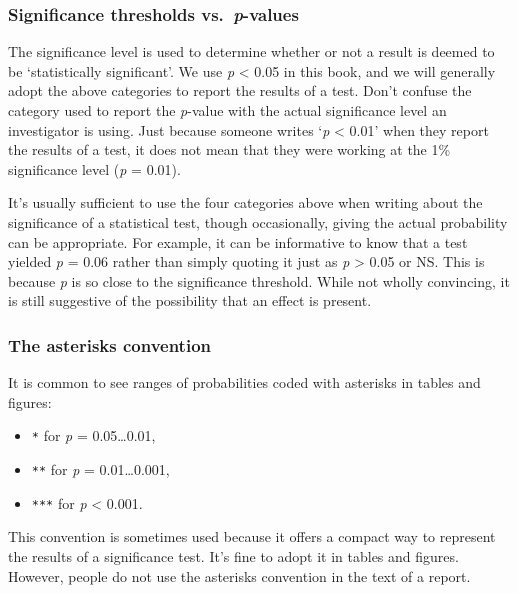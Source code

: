 \documentclass[
]{book}
\providecommand{\tightlist}{%
  \setlength{\itemsep}{0pt}\setlength{\parskip}{0pt}}
\newenvironment{greybox}{
  \definecolor{shadecolor}{rgb}{0.95,0.95,0.95}  %
  \color{black}
  \begin{shaded}}
 {\end{shaded}}
\newenvironment{infobox}[1]
  {
  \begin{itemize}
  \renewcommand{\labelitemi}{
    \raisebox{-.7\height}[0pt][0pt]{
      {\setkeys{Gin}{width=3em,keepaspectratio}
        \texttt{[image: images/\#1]}}
    }
  }
  \setlength{\fboxsep}{1em}
  \begin{greybox}
  \item
  }
  {
  \end{greybox}
  \end{itemize}
  }
\begin{document}
\begin{infobox}{warning}

\hypertarget{significance-thresholds-vs.-p-values}{%
\subsubsection*{\texorpdfstring{Significance thresholds vs.~\emph{p}-values}{Significance thresholds vs.~p-values}}\label{significance-thresholds-vs.-p-values}}

The significance level is used to determine whether or not a result is deemed to be `statistically significant'. We use \emph{p} \textless{} 0.05 in this book, and we will generally adopt the above categories to report the results of a test. Don't confuse the category used to report the \emph{p}-value with the actual significance level an investigator is using. Just because someone writes `\emph{p} \textless{} 0.01' when they report the results of a test, it does not mean that they were working at the 1\% significance level (\emph{p} = 0.01).

\end{infobox}

It's usually sufficient to use the four categories above when writing about the significance of a statistical test, though occasionally, giving the actual probability can be appropriate. For example, it can be informative to know that a test yielded \emph{p} = 0.06 rather than simply quoting it just as \emph{p} \textgreater{} 0.05 or NS. This is because \emph{p} is so close to the significance threshold. While not wholly convincing, it is still suggestive of the possibility that an effect is present.

\begin{infobox}{information}

\hypertarget{the-asterisks-convention}{%
\subsubsection*{The asterisks convention}\label{the-asterisks-convention}}

It is common to see ranges of probabilities coded with asterisks in tables and figures:

\begin{itemize}
\tightlist
\item
  \texttt{*} for \emph{p} = 0.05\ldots0.01,
\item
  \texttt{**} for \emph{p} = 0.01\ldots0.001,
\item
  \texttt{***} for \emph{p} \textless{} 0.001.
\end{itemize}

This convention is sometimes used because it offers a compact way to represent the results of a significance test. It's fine to adopt it in tables and figures. However, people do not use the asterisks convention in the text of a report.

\end{infobox}
\end{document}
